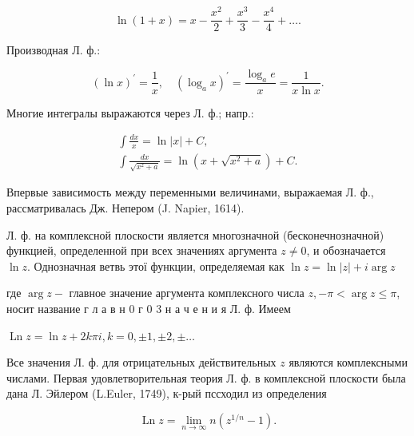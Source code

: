\documentclass[10pt]{article}
\begin{document}
\[

\ln (1+x)=x-\frac{x^{2}}{2}+\frac{x^{3}}{3}-\frac{x^{4}}{4}+\ldots .

\]



Производная Л. ф.:



\[

(\ln x)^{\prime}=\frac{1}{x}, \quad\left(\log _{a} x\right)^{\prime}=\frac{\log _{a} e}{x}=\frac{1}{x \ln x} .

\]



Многие интегралы выражаются через Л. ф.; напр.:



\[

\begin{gathered}

\int \frac{d x}{x}=\ln |x|+C, \\

\int \frac{d x}{\sqrt{x^{2}+a}}=\ln \left(x+\sqrt{x^{2}+a}\right)+C .

\end{gathered}

\]



Впервые зависимость между переменными величинами, выражаемая Л. ф., рассматривалась Дж. Непером (J. Napier, 1614).



Л. ф. на комплексной плоскости является многозначной (бесконечнозначной) функцией, определенной при всех значениях аргумента $z \neq 0$, и обозначается $\ln z$. Однозначная ветвь этої функции, определяемая как $\ln z=\ln |z|+i \arg z$



где $\arg z-$ главное значение аргумента комплексного числа $z,-\pi<\arg z \leqslant \pi$, носит название г л а в н 0 г 0 3 н а ч е н и я Л. ф. Имеем



$\operatorname{Ln} z=\ln z+2 k \pi i, k=0, \pm 1, \pm 2, \pm \ldots$



Все значения Л. ф. для отрицательных действительных $z$ являются комплексными числами. Первая удовлетворительная теория Л. ф. в комплексной плоскости была дана Л. Эйлером (L.Euler, 1749), к-рый пссходил из определения



\[

\operatorname{Ln} z=\lim _{n \rightarrow \infty} n\left(z^{1 / n}-1\right) .

\]
\end{document}
